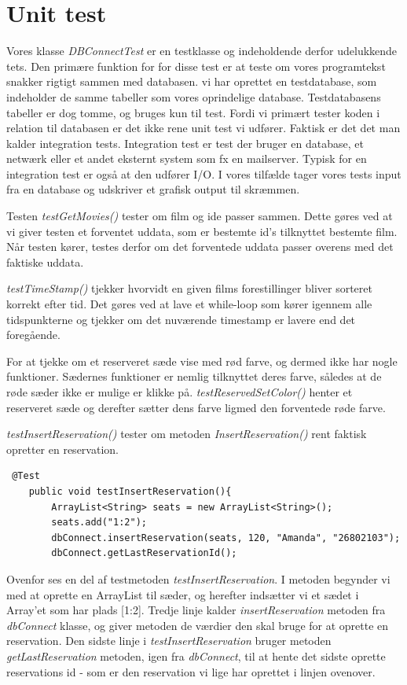 \documentclass[final]{report}
\begin{document}
\section{Unit test}
Vores klasse \emph{DBConnectTest} er en testklasse og indeholdende derfor udelukkende tets. Den primære funktion for for disse test er at teste om vores programtekst snakker rigtigt sammen med databasen. vi har oprettet en testdatabase, som indeholder de samme tabeller som vores oprindelige database. Testdatabasens tabeller er dog tomme, og bruges kun til test. 
Fordi vi primært tester koden i relation til databasen er det ikke rene unit test vi udfører. Faktisk er det det man kalder integration tests. Integration test er test der bruger en database, et netwærk eller et andet eksternt system som fx en mailserver. Typisk for en integration test er også at den udfører I/O. I vores tilfælde tager vores tests input fra en database og udskriver et grafisk output til skræmmen. \linebreak

Testen \emph{testGetMovies()} tester om film og ide passer sammen. Dette gøres ved at vi giver testen et forventet uddata, som er bestemte id's tilknyttet bestemte film. Når testen kører, testes derfor om det forventede uddata passer overens med det faktiske uddata. 

\emph{testTimeStamp()} tjekker hvorvidt en given films forestillinger bliver sorteret korrekt efter tid. Det gøres ved at lave et while-loop som kører igennem alle tidspunkterne og tjekker om det nuværende timestamp er lavere end det foregående.

For at tjekke om et reserveret sæde vise med rød farve, og dermed ikke har nogle funktioner. Sædernes funktioner er nemlig tilknyttet deres farve, således at de røde sæder ikke er mulige er klikke på. \emph{testReservedSetColor()} henter et reserveret sæde og derefter sætter dens farve ligmed den forventede røde farve. 

\emph{testInsertReservation()} tester om metoden \emph{InsertReservation()} rent faktisk opretter en reservation. \\
\begin{verbatim}
 @Test
    public void testInsertReservation(){
        ArrayList<String> seats = new ArrayList<String>();
        seats.add("1:2");
        dbConnect.insertReservation(seats, 120, "Amanda", "26802103");
        dbConnect.getLastReservationId();
\end{verbatim}
 
Ovenfor ses en del af testmetoden \emph{testInsertReservation}. I metoden begynder vi med at oprette en ArrayList til sæder, og herefter indsætter vi et sædet i Array'et som har plads [1:2]. Tredje linje kalder \emph{insertReservation} metoden fra \emph{dbConnect} klasse, og giver metoden de værdier den skal bruge for at oprette en reservation. Den sidste linje i \emph{testInsertReservation} bruger metoden \emph{getLastReservation} metoden, igen fra \emph{dbConnect}, til at hente det sidste oprette reservations id - som er den reservation vi lige har oprettet i linjen ovenover. 
\end{document}
